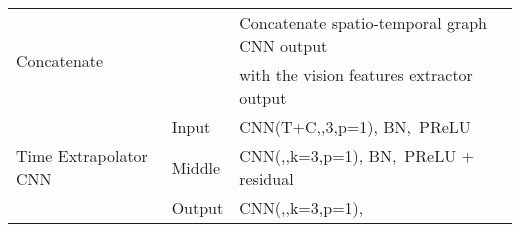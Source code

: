 \documentclass[10pt,twocolumn,letterpaper]{article}
\newcommand*{\ours}{Skeleton-Graph }
\begin{document}
\begin{table*}[ht]
\begin{tabular}{l|l|l}
\hline
\multirow{2}{*}{Concatenate}               & \multirow{2}{*}{}        & Concatenate spatio-temporal graph CNN output~                                                                                                                                                                                                         \\
                                           &                          & with the vision features extractor output                                                                                                                                                                                                             \\ 
\hline
\multirow{3}{*}{Time Extrapolator CNN}     & Input                    & CNN(T+C,,3,p=1), BN,~PReLU                                                                                                                                                                                                                           \\
                                           & Middle                   & CNN(,,k=3,p=1), BN,~PReLU + residual~                                                                                                                                                                                                               \\
                                           & Output                   & CNN(,,k=3,p=1),                                                                                                                                                                                                                                     \\
\bottomrule
\end{tabular}
\caption{ \ours architecture description. CNN = Convolutional Neural Layer, k= kernel, p= padding, s= stride, BN= Batch Normalization, PReLU = Parametric ReLU activation function, T= observed time steps, C= vision signal features channels and = predicted time steps.}
\label{tab:arch}
\end{table*}
\end{document}

